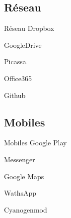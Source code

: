 \documentclass{beamer}
\begin{document}
\subsection{Réseau}
\begin{frame}{Réseau}
\noindent\vspace{0.1in}\hspace{1.0in} Dropbox \par
\noindent\vspace{0.1in}\hspace{2.5in} GoogleDrive \par
\noindent\vspace{0.1in}\hspace{1.5in} Picassa \par
\noindent\vspace{0.1in}\hspace{0.2in} Office365 \par
\noindent\vspace{0.1in}\hspace{3.5in} Github \par
\end{frame}

\subsection{Mobiles}
\begin{frame}{Mobiles}
\noindent\vspace{0.1in}\hspace{1.2in} Google Play \par
\noindent\vspace{0.1in}\hspace{2.8in} Messenger \par
\noindent\vspace{0.1in}\hspace{1.5in} Google Maps \par
\noindent\vspace{0.1in}\hspace{0.4in} WathsApp \par
\noindent\vspace{0.1in}\hspace{2.2in} Cyanogenmod \par
\end{frame}
\end{document}
